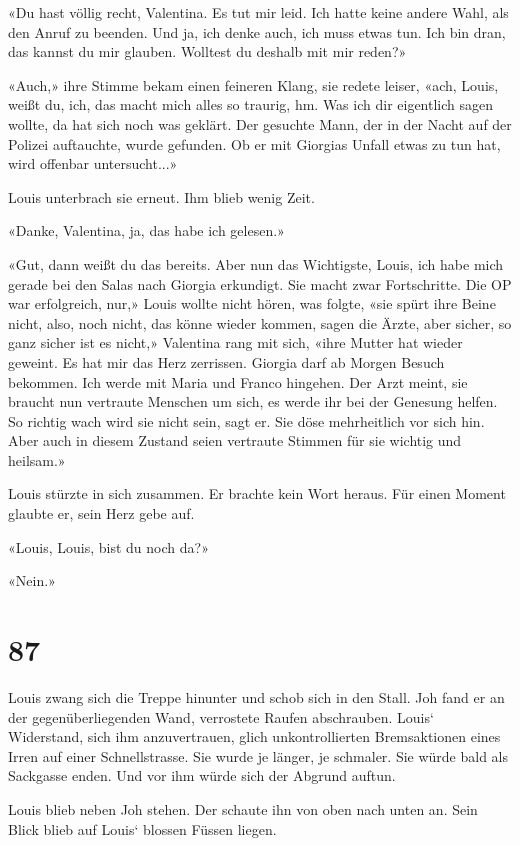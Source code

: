 «Du hast völlig recht, Valentina. Es tut mir leid. Ich hatte keine
andere Wahl, als den Anruf zu beenden. Und ja, ich denke auch, ich muss
etwas tun. Ich bin dran, das kannst du mir glauben. Wolltest du deshalb
mit mir reden?»

«Auch,» ihre Stimme bekam einen feineren Klang, sie redete leiser, «ach,
Louis, weißt du, ich, das macht mich alles so traurig, hm. Was ich dir
eigentlich sagen wollte, da hat sich noch was geklärt. Der gesuchte
Mann, der in der Nacht auf der Polizei auftauchte, wurde gefunden. Ob er
mit Giorgias Unfall etwas zu tun hat, wird offenbar untersucht...»

Louis unterbrach sie erneut. Ihm blieb wenig Zeit.

«Danke, Valentina, ja, das habe ich gelesen.»

«Gut, dann weißt du das bereits. Aber nun das Wichtigste, Louis, ich
habe mich gerade bei den Salas nach Giorgia erkundigt. Sie macht zwar
Fortschritte. Die OP war erfolgreich, nur,» Louis wollte nicht hören,
was folgte, «sie spürt ihre Beine nicht, also, noch nicht, das könne
wieder kommen, sagen die Ärzte, aber sicher, so ganz sicher ist es
nicht,» Valentina rang mit sich, «ihre Mutter hat wieder geweint. Es hat
mir das Herz zerrissen. Giorgia darf ab Morgen Besuch bekommen. Ich
werde mit Maria und Franco hingehen. Der Arzt meint, sie braucht nun
vertraute Menschen um sich, es werde ihr bei der Genesung helfen. So
richtig wach wird sie nicht sein, sagt er. Sie döse mehrheitlich vor
sich hin. Aber auch in diesem Zustand seien vertraute Stimmen für sie
wichtig und heilsam.»

Louis stürzte in sich zusammen. Er brachte kein Wort heraus. Für einen
Moment glaubte er, sein Herz gebe auf.

«Louis, Louis, bist du noch da?»

«Nein.»

\chapter{87}\label{section-87}

Louis zwang sich die Treppe hinunter und schob sich in den Stall. Joh
fand er an der gegenüberliegenden Wand, verrostete Raufen abschrauben.
Louis` Widerstand, sich ihm anzuvertrauen, glich unkontrollierten
Bremsaktionen eines Irren auf einer Schnellstrasse. Sie wurde je länger,
je schmaler. Sie würde bald als Sackgasse enden. Und vor ihm würde sich
der Abgrund auftun.

Louis blieb neben Joh stehen. Der schaute ihn von oben nach unten an.
Sein Blick blieb auf Louis` blossen Füssen liegen.

